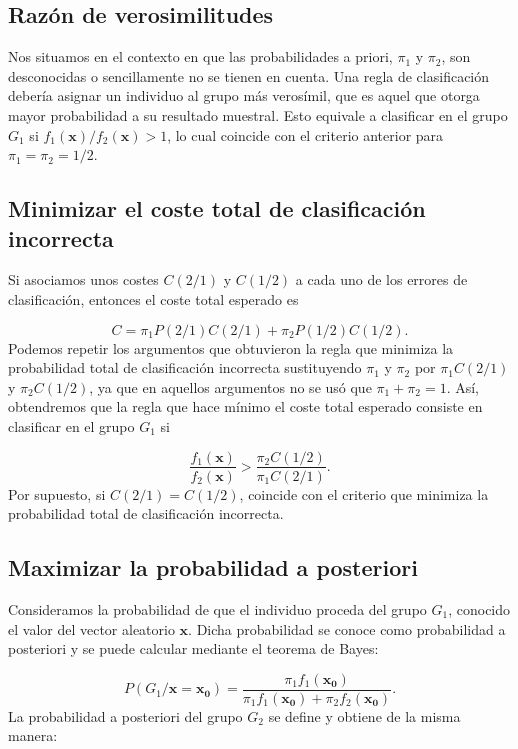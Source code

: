 \documentclass[
  a4paper,
  oneside]{scrbook}
\theoremstyle{definition}
\theoremstyle{definition}
\theoremstyle{definition}
\theoremstyle{definition}
\theoremstyle{remark}
\begin{document}
\subsection{Razón de verosimilitudes}\label{razon-de-verosimilitudes}

Nos situamos en el contexto en que las probabilidades a priori, \(\pi_1\)
y \(\pi_2\), son desconocidas o sencillamente no se tienen en cuenta. Una
regla de clasificación debería asignar un individuo al grupo más
verosímil, que es aquel que otorga mayor probabilidad a su resultado
muestral. Esto equivale a clasificar en el grupo \(G_1\) si
\(f_1(\bm{x})/f_2(\bm{x})>1\), lo cual coincide con el criterio anterior
para \(\pi_1=\pi_2=1/2\).

\subsection{Minimizar el coste total de clasificación incorrecta}\label{minimizar-el-coste-total-de-clasificacion-incorrecta}

Si asociamos unos costes \(C(2/1)\) y \(C(1/2)\) a cada uno de los errores
de clasificación, entonces el coste total esperado es

\[C=\pi_1P(2/1)C(2/1)+\pi_2P(1/2)C(1/2).\] Podemos repetir los argumentos
que obtuvieron la regla que minimiza la probabilidad total de
clasificación incorrecta sustituyendo \(\pi_1\) y \(\pi_2\) por
\(\pi_1C(2/1)\) y \(\pi_2C(1/2)\), ya que en aquellos argumentos no se usó
que \(\pi_1+\pi_2=1\). Así, obtendremos que la regla que hace mínimo el
coste total esperado consiste en clasificar en el grupo \(G_1\) si

\[\frac{f_1(\bm{x})}{f_2(\bm{x})}>\frac{\pi_2C(1/2)}{\pi_1C(2/1)}.\] Por
supuesto, si \(C(2/1)=C(1/2)\), coincide con el criterio que minimiza la
probabilidad total de clasificación incorrecta.

\subsection{Maximizar la probabilidad a posteriori}\label{maximizar-la-probabilidad-a-posteriori}

Consideramos la probabilidad de que el individuo proceda del grupo
\(G_1\), conocido el valor del vector aleatorio \(\bm{x}\). Dicha
probabilidad se conoce como probabilidad a posteriori y se puede
calcular mediante el teorema de Bayes:

\[P(G_1/\bm{x}=\bm{x_0})=\frac{\pi_1 f_1(\bm{x_0})}{\pi_1 f_1(\bm{x_0})+\pi_2 f_2(\bm{x_0})}.\]
La probabilidad a posteriori del grupo \(G_2\) se define y obtiene de la
misma manera:
\end{document}

